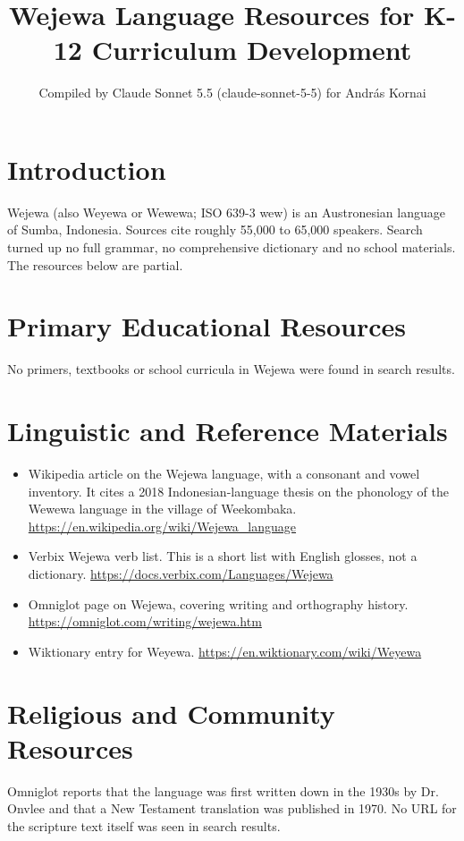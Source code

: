\documentclass[12pt]{article}
\title{Wejewa Language Resources for K-12 Curriculum Development}
\author{Compiled by Claude Sonnet 5.5 (claude-sonnet-5-5) for Andr\'as Kornai}
\date{}
\begin{document}
\maketitle

\section{Introduction}
Wejewa (also Weyewa or Wewewa; ISO 639-3 wew) is an Austronesian language of Sumba, Indonesia. Sources cite roughly 55,000 to 65,000 speakers. Search turned up no full grammar, no comprehensive dictionary and no school materials. The resources below are partial.

\section{Primary Educational Resources}
No primers, textbooks or school curricula in Wejewa were found in search results.

\section{Linguistic and Reference Materials}
\begin{itemize}
\item Wikipedia article on the Wejewa language, with a consonant and vowel inventory. It cites a 2018 Indonesian-language thesis on the phonology of the Wewewa language in the village of Weekombaka. \url{https://en.wikipedia.org/wiki/Wejewa_language}
\item Verbix Wejewa verb list. This is a short list with English glosses, not a dictionary. \url{https://docs.verbix.com/Languages/Wejewa}
\item Omniglot page on Wejewa, covering writing and orthography history. \url{https://omniglot.com/writing/wejewa.htm}
\item Wiktionary entry for Weyewa. \url{https://en.wiktionary.com/wiki/Weyewa}
\end{itemize}

\section{Religious and Community Resources}
Omniglot reports that the language was first written down in the 1930s by Dr. Onvlee and that a New Testament translation was published in 1970. No URL for the scripture text itself was seen in search results.
\end{document}
